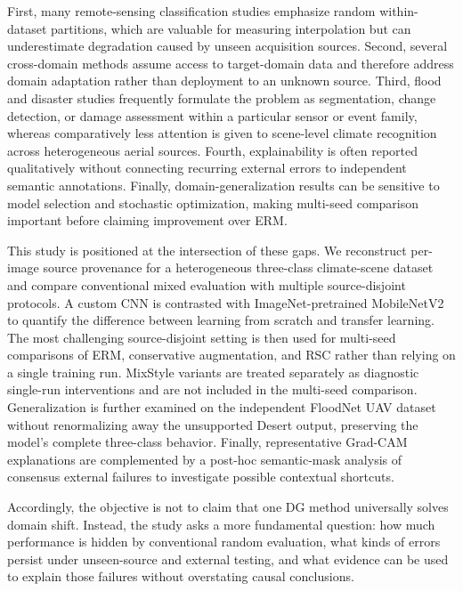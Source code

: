 First, many remote-sensing classification studies emphasize random within-dataset partitions, which are valuable for measuring interpolation but can underestimate degradation caused by unseen acquisition sources. Second, several cross-domain methods assume access to target-domain data and therefore address domain adaptation rather than deployment to an unknown source. Third, flood and disaster studies frequently formulate the problem as segmentation, change detection, or damage assessment within a particular sensor or event family, whereas comparatively less attention is given to scene-level climate recognition across heterogeneous aerial sources. Fourth, explainability is often reported qualitatively without connecting recurring external errors to independent semantic annotations. Finally, domain-generalization results can be sensitive to model selection and stochastic optimization, making multi-seed comparison important before claiming improvement over ERM.

This study is positioned at the intersection of these gaps. We reconstruct per-image source provenance for a heterogeneous three-class climate-scene dataset and compare conventional mixed evaluation with multiple source-disjoint protocols. A custom CNN is contrasted with ImageNet-pretrained MobileNetV2 to quantify the difference between learning from scratch and transfer learning. The most challenging source-disjoint setting is then used for multi-seed comparisons of ERM, conservative augmentation, and RSC rather than relying on a single training run. MixStyle variants are treated separately as diagnostic single-run interventions and are not included in the multi-seed comparison. Generalization is further examined on the independent FloodNet UAV dataset without renormalizing away the unsupported Desert output, preserving the model's complete three-class behavior. Finally, representative Grad-CAM explanations are complemented by a post-hoc semantic-mask analysis of consensus external failures to investigate possible contextual shortcuts.

Accordingly, the objective is not to claim that one DG method universally solves domain shift. Instead, the study asks a more fundamental question: how much performance is hidden by conventional random evaluation, what kinds of errors persist under unseen-source and external testing, and what evidence can be used to explain those failures without overstating causal conclusions.
